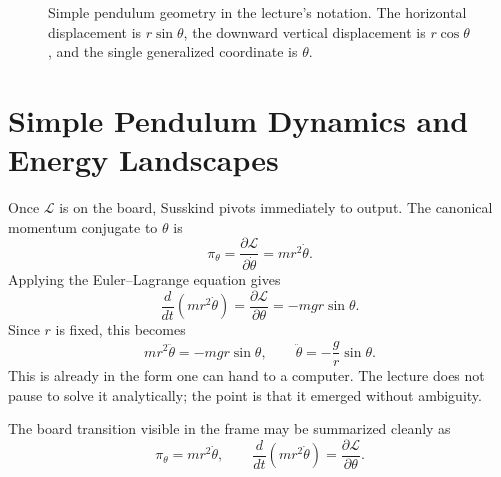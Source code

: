 \begin{figure}[h]
\centering
{}
\caption{Simple pendulum geometry in the lecture's notation. The horizontal displacement is \(r\sin\theta\), the downward vertical displacement is \(r\cos\theta\), and the single generalized coordinate is \(\theta\).}
\end{figure}

\section{Simple Pendulum Dynamics and Energy Landscapes}

Once \(\mathcal{L}\) is on the board, Susskind pivots immediately to output. The canonical momentum conjugate to \(\theta\) is
\begin{equation}
\pi_\theta=\frac{\partial\mathcal{L}}{\partial\dot\theta}=mr^2\dot\theta.
\end{equation}
Applying the Euler--Lagrange equation gives
\begin{equation}
\frac{d}{dt}\left(mr^2\dot\theta\right)
=
\frac{\partial\mathcal{L}}{\partial\theta}
=
-mgr\sin\theta.
\end{equation}
Since \(r\) is fixed, this becomes
\begin{equation}
mr^2\ddot\theta=-mgr\sin\theta,
\qquad
\ddot\theta=-\frac{g}{r}\sin\theta.
\end{equation}
This is already in the form one can hand to a computer. The lecture does not pause to solve it analytically; the point is that it emerged without ambiguity.

The board transition visible in the frame may be summarized cleanly as
\begin{equation}
\pi_\theta=mr^2\dot\theta,
\qquad
\frac{d}{dt}\left(mr^2\dot\theta\right)=\frac{\partial\mathcal{L}}{\partial\theta}.
\end{equation}


